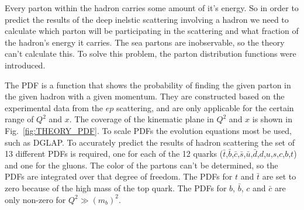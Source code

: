 Every parton within the hadron carries some amount of it's energy. So in order to predict the results of the deep inelstic scattering involving a hadron we need to calculate which parton will be participating in the scattering and what fraction of the hadron's energy it carries. The sea partons are inobservable, so the theory can't calculate this. To solve this problem, the parton distribution functions were introduced.

\begin{figure}
\end{figure}

The PDF is a function that shows the probability of finding the given parton in the given hadron with a given momentum. They are constructed based on the experimental data from the $ep$ scattering, and are only applicable for the certain range of $Q^{2}$ and $x$. The coverage of the kinematic plane in $Q^{2}$ and $x$ is shown in Fig.~\ref{fig:THEORY_PDF}. To scale PDFs the evolution equations most be used, such as DGLAP. To accurately predict the results of hadron scattering the set of 13 different PDFs is required, one for each of the 12 quarks ($\bar{t}$,$\bar{b}$,$\bar{c}$,$\bar{s}$,$\bar{u}$,$\bar{d}$,$d$,$u$,$s$,$c$,$b$,$t$) and one for the gluons. The color of the partons can't be determined, so the PDFs are integrated over that degree of freedom. The PDFs for $t$ and $\bar{t}$ are set to zero because of the high mass of the top quark. The PDFs for $b$, $\bar{b}$, $c$ and $\bar{c}$ are only non-zero for $Q^{2} \gg (m_{b})^{2}$.

